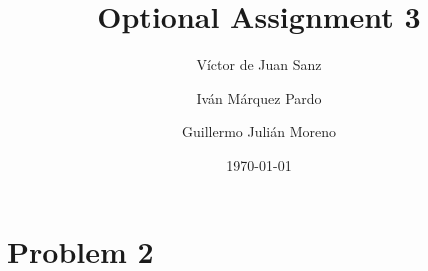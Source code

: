 \documentclass{article}
\title{Optional Assignment 3}
\date{\today}
\author{V\'ictor de Juan Sanz \and Iv\'an M\'arquez Pardo\and Guillermo Juli\'an Moreno}
\begin{document}
\maketitle



\newpage
\section{Problem 2}



\newpage
\appendix


\end{document}
